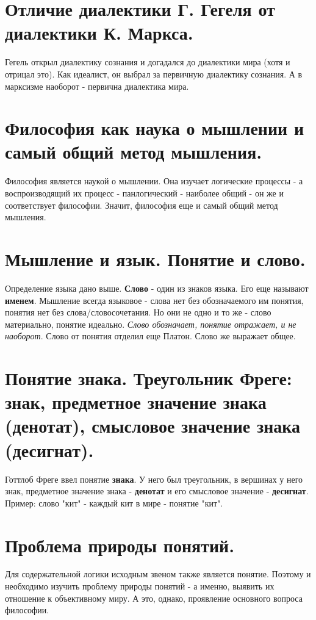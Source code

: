 \section{ Отличие диалектики Г. Гегеля от диалектики К. Маркса.}
Гегель открыл диалектику сознания и догадался до диалектики мира (хотя и отрицал это). Как идеалист, он выбрал за первичную диалектику сознания. А в марксизме наоборот - первична диалектика мира.

\section{ Философия как наука о мышлении и самый общий метод мышления.}
Философия является наукой о мышлении. Она изучает логические процессы - а воспроизводящий их процесс - панлогический - наиболее общий  - он же и соответствует философии. Значит, философия еще и самый общий метод мышления.

\section{ Мышление и язык. Понятие и слово.}
Определение языка дано выше. \textbf{Слово} - один из знаков языка. Его еще называют \textbf{именем}.  
Мышление всегда языковое - слова нет без обозначаемого им понятия, понятия нет без слова/словосочетания. Но они не одно и то же - слово материально, понятие идеально. \textit{Слово обозначает, понятие отражает, и не наоборот}. Слово от понятия отделил еще Платон.  Слово же выражает общее.

\section{ Понятие знака. Треугольник Фреге: знак, предметное значение знака (денотат), смысловое значение знака (десигнат).}
Готтлоб Фреге ввел понятие \textbf{знака}. У него был треугольник, в вершинах у него знак, предметное значение знака - \textbf{денотат} и его смысловое значение - \textbf{десигнат}. Пример: слово "кит" - каждый кит в мире - понятие "кит".

\section{ Проблема природы понятий.}
Для содержательной логики исходным звеном также является понятие. Поэтому и необходимо изучить проблему природы понятий - а именно, выявить их отношение к объективному миру. А это, однако, проявление основного вопроса философии. 

